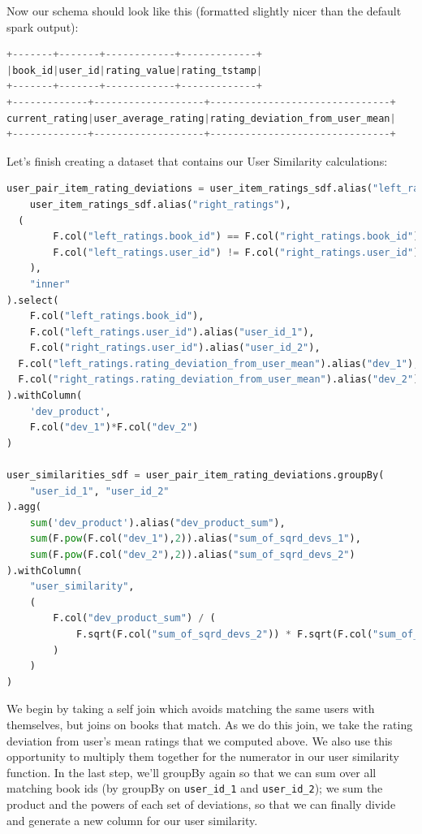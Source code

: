 Now our schema should look like this (formatted slightly nicer than the default spark output):

\begin{lstlisting}[language=Python]
+-------+-------+------------+-------------+
|book_id|user_id|rating_value|rating_tstamp|
+-------+-------+------------+-------------+
+-------------+-------------------+-------------------------------+
current_rating|user_average_rating|rating_deviation_from_user_mean|
+-------------+-------------------+-------------------------------+
\end{lstlisting}

Let's finish creating a dataset that contains our User Similarity calculations:

\begin{lstlisting}[language=Python]
user_pair_item_rating_deviations = user_item_ratings_sdf.alias("left_ratings").join(
	user_item_ratings_sdf.alias("right_ratings"), 
  (
		F.col("left_ratings.book_id") == F.col("right_ratings.book_id") &\
		F.col("left_ratings.user_id") != F.col("right_ratings.user_id")
	),
	"inner"
).select(
	F.col("left_ratings.book_id"),
	F.col("left_ratings.user_id").alias("user_id_1"), 
	F.col("right_ratings.user_id").alias("user_id_2"),
  F.col("left_ratings.rating_deviation_from_user_mean").alias("dev_1"),
  F.col("right_ratings.rating_deviation_from_user_mean").alias("dev_2")
).withColumn(
	'dev_product', 
	F.col("dev_1")*F.col("dev_2")
)

user_similarities_sdf = user_pair_item_rating_deviations.groupBy(
	"user_id_1", "user_id_2"
).agg(
	sum('dev_product').alias("dev_product_sum"),
	sum(F.pow(F.col("dev_1"),2)).alias("sum_of_sqrd_devs_1"),
	sum(F.pow(F.col("dev_2"),2)).alias("sum_of_sqrd_devs_2")
).withColumn(
	"user_similarity",
	(
		F.col("dev_product_sum") / (
			F.sqrt(F.col("sum_of_sqrd_devs_2")) * F.sqrt(F.col("sum_of_sqrd_devs_2"))
		)
	)
)
\end{lstlisting}

We begin by taking a self join which avoids matching the same users with themselves, but joins on books that match. As we do this join, we take the rating deviation from user's mean ratings that we computed above. We also use this opportunity to multiply them together for the numerator in our user similarity function. In the last step, we'll groupBy again so that we can sum over all matching book ids (by groupBy on \lstinline{user_id_1} and \lstinline{user_id_2}); we sum the product and the powers of each set of deviations, so that we can finally divide and generate a new column for our user similarity. 

